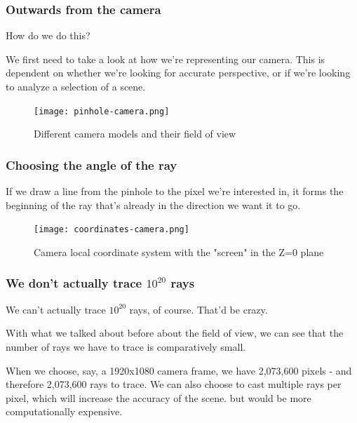 \documentclass[12pt]{beamer}
\begin{document}
  \begin{frame}
    \frametitle{Outwards from the camera}

    How do we do this?

    We first need to take a look at how we're representing our camera.
    This is dependent on whether we're looking for accurate perspective, or if we're looking to analyze a selection of a scene.



    \begin{figure}
      \centering
      \texttt{[image: pinhole-camera.png]}
      \caption{Different camera models and their field of view}\label{fig:camera-models}
    \end{figure}

  \end{frame}

  \begin{frame}
    \frametitle{Choosing the angle of the ray}

    If we draw a line from the pinhole to the pixel we're interested in, it forms the beginning of the ray that's already in the direction we want it to go.

    \begin{figure}
      \centering
      \texttt{[image: coordinates-camera.png]}
      \caption{Camera local coordinate system with the "screen" in the Z=0 plane}\label{fig:camera-coordinates}
    \end{figure}



  \end{frame}

  \begin{frame}
    \frametitle{We don't actually trace $10^{20}$ rays}

    We can't actually trace $10^{20}$ rays, of course.
    That'd be crazy.

    With what we talked about before about the field of view, we can see that the number of rays we have to trace is comparatively small.

    When we choose, say, a 1920x1080 camera frame, we have 2,073,600 pixels - and therefore 2,073,600 rays to trace.
    We can also choose to cast multiple rays per pixel, which will increase the accuracy of the scene.
    but would be more computationally expensive.

  \end{frame}
\end{document}
